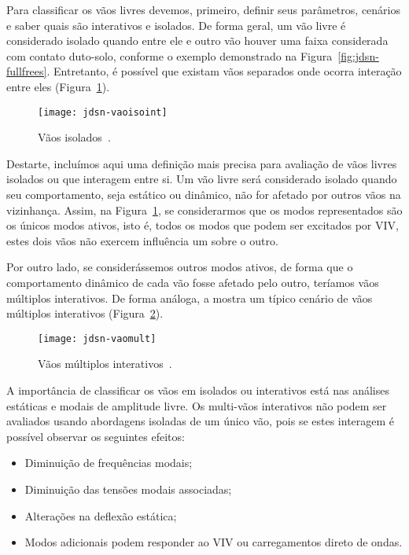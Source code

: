 Para classificar os vãos livres devemos, primeiro, definir seus parâmetros, cenários e saber quais são interativos e isolados. De forma geral, um vão livre é considerado isolado quando entre ele e outro vão houver uma faixa considerada com contato duto-solo, conforme o exemplo demonstrado na Figura~\ref{fig:jdsn-fullfrees}. Entretanto, é possível que existam vãos separados onde ocorra interação entre eles (Figura~\ref{fig:jdsn-vaoisoint}).

\begin{figure}[hbt!]
\begin{center}
\texttt{[image: jdsn-vaoisoint]}
\caption{Vãos isolados~\cite{DNV2017}.}
\label{fig:jdsn-vaoisoint}
\end{center}
\end{figure}

Destarte, incluímos aqui uma definição mais precisa para avaliação de vãos livres isolados ou que interagem entre si. Um vão livre será considerado isolado quando seu comportamento, seja estático ou dinâmico, não for afetado por outros vãos na vizinhança. Assim, na Figura~\ref{fig:jdsn-vaoisoint}, se considerarmos que os modos representados são os únicos modos ativos, isto é, todos os modos que podem ser excitados por VIV, estes dois vãos não exercem influência um sobre o outro. 

Por outro lado, se considerássemos outros modos ativos, de forma que o comportamento dinâmico de cada vão fosse afetado pelo outro, teríamos vãos múltiplos interativos. De forma análoga, a  mostra um típico cenário de vãos múltiplos interativos (Figura~\ref{fig:jdsn-vaomult}).

\begin{figure}[hbt!]
\begin{center}
\texttt{[image: jdsn-vaomult]}
\caption{Vãos múltiplos interativos~\cite{DNV2017}.}
\label{fig:jdsn-vaomult}
\end{center}
\end{figure}

A importância de classificar os vãos em isolados ou interativos está nas análises estáticas e modais de amplitude livre. Os multi-vãos interativos não podem ser avaliados usando abordagens isoladas de um único vão, pois se estes interagem é possível observar os seguintes efeitos:

	\begin{itemize}
		\item Diminuição de frequências modais;
		\item Diminuição das tensões modais associadas;
		\item Alterações na deflexão estática;
		\item Modos adicionais podem responder ao VIV ou carregamentos direto de ondas.
	\end{itemize}

